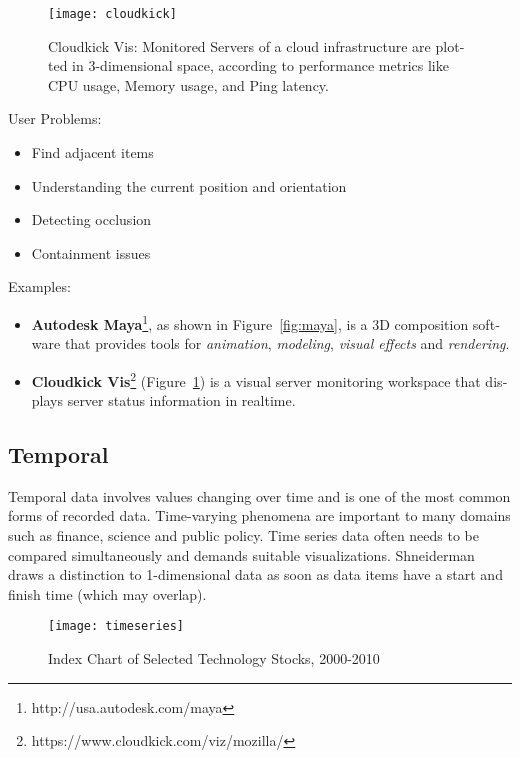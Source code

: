 \begin{english}
\begin{figure}
\centering
\texttt{[image: cloudkick]}
\caption{Cloudkick Vis: Monitored Servers of a cloud infrastructure are plotted in 3-dimensional space, according to performance metrics like CPU usage, Memory usage, and Ping latency.}
\label{fig:cloudkick}
\end{figure}


\SuperPar User Problems:

\begin{itemize}
\item Find adjacent items
\item Understanding the current position and orientation
\item Detecting occlusion
\item Containment issues
\end{itemize}


\SuperPar Examples:

\begin{itemize}
\item \textbf{Autodesk Maya}\footnote{http://usa.autodesk.com/maya}, as shown in Figure~\ref{fig:maya}, is a 3D composition software that provides tools for \emph{animation}, \emph{modeling}, \emph{visual effects} and \emph{rendering}.
\item \textbf{Cloudkick Vis}\footnote{https://www.cloudkick.com/viz/mozilla/} (Figure~\ref{fig:cloudkick}) is a visual server monitoring workspace that displays server status information in realtime.
\end{itemize}


\subsection{Temporal}

Temporal data involves values changing over time and is one of the most common forms of recorded data. Time-varying phenomena are important to many domains such as finance, science and public policy. Time series data often needs to be compared simultaneously and demands suitable visualizations. Shneiderman~\cite{shneiderman96eyes} draws a distinction to 1-dimensional data as soon as data items have a start and finish time (which may overlap).


\begin{figure}
\centering
\texttt{[image: timeseries]}
\caption{Index Chart of Selected Technology Stocks, 2000-2010}
\label{fig:timeseries}
\end{figure}


\end{english}
